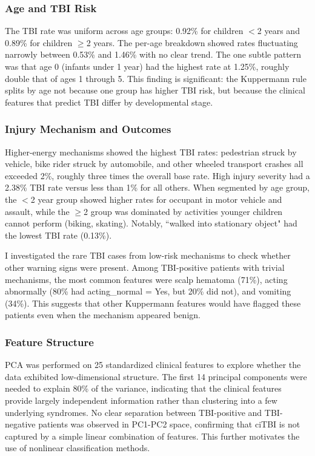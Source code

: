 \documentclass[11pt,letterpaper]{article}
\begin{document}
\subsubsection{Age and TBI Risk}

The TBI rate was uniform across age groups: 0.92\% for children $<$2 years and 0.89\% for children $\geq$2 years. The per-age breakdown showed rates fluctuating narrowly between 0.53\% and 1.46\% with no clear trend. The one subtle pattern was that age 0 (infants under 1 year) had the highest rate at 1.25\%, roughly double that of ages 1 through 5. This finding is significant: the Kuppermann rule splits by age not because one group has higher TBI risk, but because the clinical features that predict TBI differ by developmental stage.


\subsubsection{Injury Mechanism and Outcomes}

Higher-energy mechanisms showed the highest TBI rates: pedestrian struck by vehicle, bike rider struck by automobile, and other wheeled transport crashes all exceeded 2\%, roughly three times the overall base rate. High injury severity had a 2.38\% TBI rate versus less than 1\% for all others. When segmented by age group, the $<$2 year group showed higher rates for occupant in motor vehicle and assault, while the $\geq$2 group was dominated by activities younger children cannot perform (biking, skating). Notably, ``walked into stationary object" had the lowest TBI rate (0.13\%).




I investigated the rare TBI cases from low-risk mechanisms to check whether other warning signs were present. Among TBI-positive patients with trivial mechanisms, the most common features were scalp hematoma (71\%), acting abnormally (80\% had acting\_normal = Yes, but 20\% did not), and vomiting (34\%). This suggests that other Kuppermann features would have flagged these patients even when the mechanism appeared benign.


\subsubsection{Feature Structure}

PCA was performed on 25 standardized clinical features to explore whether the data exhibited low-dimensional structure. The first 14 principal components were needed to explain 80\% of the variance, indicating that the clinical features provide largely independent information rather than clustering into a few underlying syndromes. No clear separation between TBI-positive and TBI-negative patients was observed in PC1-PC2 space, confirming that ciTBI is not captured by a simple linear combination of features. This further motivates the use of nonlinear classification methods.
\end{document}
